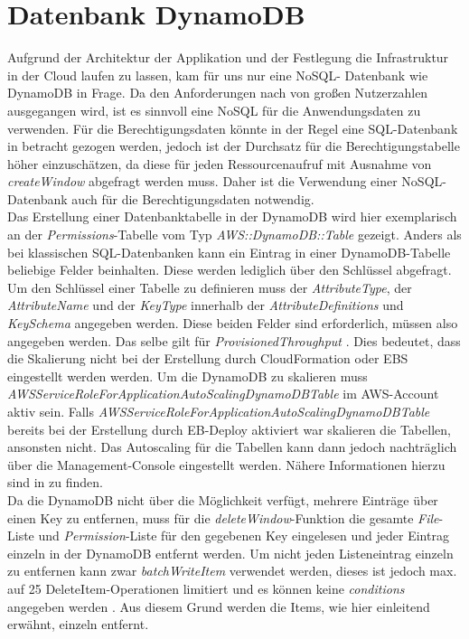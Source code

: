\documentclass[a4paper, 12pt]{scrreprt}
\renewcommand\_{\textunderscore\allowbreak}
\begin{document}
\section{Datenbank DynamoDB}
\label{db}
Aufgrund der Architektur der Applikation und der Festlegung die Infrastruktur in der Cloud laufen zu lassen, kam für uns nur eine NoSQL- Datenbank wie DynamoDB in Frage. Da den Anforderungen nach von großen Nutzerzahlen ausgegangen wird, ist es sinnvoll eine NoSQL für die Anwendungsdaten zu verwenden. Für die Berechtigungsdaten könnte in der Regel eine SQL-Datenbank in betracht gezogen werden, jedoch ist der Durchsatz für die Berechtigungstabelle höher einzuschätzen, da diese für jeden Ressourcenaufruf mit Ausnahme von \textit{createWindow} abgefragt werden muss. Daher ist die Verwendung einer NoSQL-Datenbank auch für die Berechtigungsdaten notwendig.\\
Das Erstellung einer Datenbanktabelle in der DynamoDB wird hier exemplarisch an der \textit{Permissions}-Tabelle vom Typ \textit{AWS::DynamoDB::Table} gezeigt. Anders als bei klassischen SQL-Datenbanken kann ein Eintrag in einer DynamoDB-Tabelle beliebige Felder beinhalten. Diese werden lediglich über den Schlüssel abgefragt. Um den Schlüssel einer Tabelle zu definieren muss der \textit{AttributeType}, der \textit{AttributeName} und der \textit{KeyType} innerhalb der \textit{AttributeDefinitions} und \textit{KeySchema} angegeben werden. Diese beiden Felder sind erforderlich, müssen also angegeben werden. Das selbe gilt für \textit{ProvisionedThroughput} \cite{AWSDa}.
Dies bedeutet, dass die Skalierung nicht bei der Erstellung durch CloudFormation oder EBS eingestellt werden werden. Um die DynamoDB zu skalieren muss \textit{AWSServiceRoleForApplicationAutoScaling\_DynamoDBTable} im AWS-Account aktiv sein. Falls \textit{AWSServiceRoleForApplicationAutoScaling\_DynamoDBTable} bereits bei der Erstellung durch EB-Deploy aktiviert war skalieren die Tabellen,  ansonsten nicht. Das Autoscaling für die Tabellen kann dann jedoch nachträglich über die Management-Console eingestellt werden. Nähere Informationen hierzu sind in \cite{AWSDb} zu finden.
\\[0.5cm]
Da die DynamoDB nicht über die Möglichkeit verfügt, mehrere Einträge über einen Key zu entfernen, muss für die \textit{deleteWindow}-Funktion die gesamte \textit{File}-Liste und \textit{Permission}-Liste für den gegebenen Key eingelesen und jeder Eintrag einzeln in der DynamoDB entfernt werden.
Um nicht jeden Listeneintrag einzeln zu entfernen kann zwar \textit{batchWriteItem} verwendet werden, dieses ist jedoch max. auf 25 DeleteItem-Operationen limitiert und es können keine \textit{conditions} angegeben werden \cite{AWSJSSDKD}. Aus diesem Grund werden die Items, wie hier einleitend erwähnt, einzeln entfernt.
\end{document}
